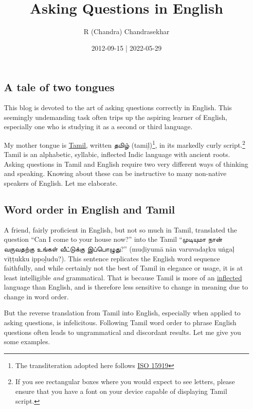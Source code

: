 \documentclass[
  a4paper,
]{article}
\title{Asking Questions in English}
\author{R (Chandra) Chandrasekhar}
\date{2012-09-15 | 2022-05-29}
\begin{document}
\maketitle




\hypertarget{a-tale-of-two-tongues}{%
\subsection{A tale of two tongues}\label{a-tale-of-two-tongues}}

This blog is devoted to the art of asking questions correctly in
English. This seemingly undemanding task often trips up the aspiring
learner of English, especially one who is studying it as a second or
third language.

My mother tongue is
\href{http://en.wikipedia.org/wiki/Tamil_language}{Tamil,} written தமிழ்
(tamiḻ)\footnote{The transliteration adopted here follows
  \href{https://en.wikipedia.org/wiki/ISO_15919}{ISO 15919}}, in its
markedly curly script.\footnote{If you see rectangular boxes where you
  would expect to see letters, please ensure that you have a font on
  your device capable of displaying Tamil script.} Tamil is an
alphabetic, syllabic, inflected Indic language with ancient roots.
Asking questions in Tamil and English require two very different ways of
thinking and speaking. Knowing about these can be instructive to many
non-native speakers of English. Let me elaborate.

\hypertarget{word-order-in-english-and-tamil}{%
\subsection{Word order in English and
Tamil}\label{word-order-in-english-and-tamil}}

A friend, fairly proficient in English, but not so much in Tamil,
translated the question ``Can I come to your house now?'' into the Tamil
``முடியுமா நான் வருவதற்கு உங்கள் வீட்டுக்கு இப்பொழுது?'' (muḍiyumā nān
varuvadaṟku uṅgaḷ vīṭṭukku ippoḻudu?). This sentence replicates the
English word sequence faithfully, and while certainly not the best of
Tamil in elegance or usage, it is at least intelligible \emph{and}
grammatical. That is because Tamil is more of an
\href{http://en.wikipedia.org/wiki/Inflection}{inflected} language than
English, and is therefore less sensitive to change in meaning due to
change in word order.

But the reverse translation from Tamil into English, especially when
applied to asking questions, is infelicitous. Following Tamil word order
to phrase English questions often leads to ungrammatical and discordant
results. Let me give you some examples.
\end{document}
